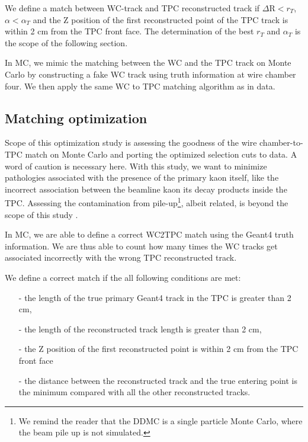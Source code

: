 We define a match between WC-track and TPC reconstructed track if  $\Delta \text{R} < r_{T}$, $\alpha < \alpha_{T}$ and the Z position of the first reconstructed point of the TPC track is within 2 cm from the TPC front face. The determination of the best $r_{T}$ and $\alpha_{T}$ is the scope of the following section.

In MC, we mimic the matching between the WC and the TPC track on Monte Carlo by constructing a fake WC track using truth information at wire chamber four. We then apply the same WC to TPC matching algorithm as in data. 

\subsection{Matching optimization}
Scope of this optimization study is assessing the goodness of the wire chamber-to-TPC match on Monte Carlo and porting the optimized selection cuts to data. A word of caution is necessary here. With this study, we want to minimize pathologies associated with the presence of the primary kaon itself, like the incorrect association between the beamline kaon its decay products inside the TPC.  Assessing the contamination from pile-up\footnote{We remind the reader that the DDMC is a single particle Monte Carlo, where the beam pile up is not simulated.}, albeit related, is beyond the scope of this study .



In MC, we are able to define a correct WC2TPC match using the Geant4 truth information. We are thus able to count how many times the WC tracks get associated incorrectly with the wrong TPC reconstructed track. 

We define a correct match if the all following conditions are met:
\begin{itemize}
\item[-] the length of the true primary Geant4 track in the TPC is greater than 2 cm,  
\item[-] the length of the reconstructed track length is greater than 2 cm,
\item[-] the Z position of the first reconstructed point is within 2 cm from the TPC front face
\item[-] the distance between the reconstructed track and the true entering point is the minimum compared with all the other reconstructed tracks.
\end{itemize}

